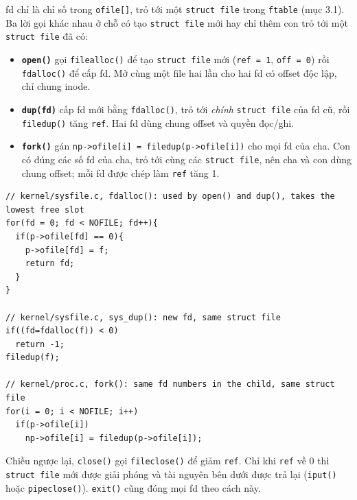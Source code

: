 fd chỉ là chỉ số trong \texttt{ofile[]}, trỏ tới một \texttt{struct file} trong \texttt{ftable} (mục 3.1). Ba lời gọi khác nhau ở chỗ có tạo \texttt{struct file} mới hay chỉ thêm con trỏ tới một \texttt{struct file} đã có:
\begin{itemize}
    \item \textbf{\texttt{open()}} gọi \texttt{filealloc()} để tạo \texttt{struct file} mới (\texttt{ref = 1}, \texttt{off = 0}) rồi \texttt{fdalloc()} để cấp fd. Mở cùng một file hai lần cho hai fd có offset độc lập, chỉ chung inode.
    \item \textbf{\texttt{dup(fd)}} cấp fd mới bằng \texttt{fdalloc()}, trỏ tới \emph{chính} \texttt{struct file} của fd cũ, rồi \texttt{filedup()} tăng \texttt{ref}. Hai fd dùng chung offset và quyền đọc/ghi.
    \item \textbf{\texttt{fork()}} gán \texttt{np->ofile[i] = filedup(p->ofile[i])} cho mọi fd của cha. Con có đúng các số fd của cha, trỏ tới cùng các \texttt{struct file}, nên cha và con dùng chung offset; mỗi fd được chép làm \texttt{ref} tăng 1.
\end{itemize}

\begin{lstlisting}[style=xv6code]
// kernel/sysfile.c, fdalloc(): used by open() and dup(), takes the lowest free slot
for(fd = 0; fd < NOFILE; fd++){
  if(p->ofile[fd] == 0){
    p->ofile[fd] = f;
    return fd;
  }
}

// kernel/sysfile.c, sys_dup(): new fd, same struct file
if((fd=fdalloc(f)) < 0)
  return -1;
filedup(f);

// kernel/proc.c, fork(): same fd numbers in the child, same struct file
for(i = 0; i < NOFILE; i++)
  if(p->ofile[i])
    np->ofile[i] = filedup(p->ofile[i]);
\end{lstlisting}

Chiều ngược lại, \texttt{close()} gọi \texttt{fileclose()} để giảm \texttt{ref}. Chỉ khi \texttt{ref} về 0 thì \texttt{struct file} mới được giải phóng và tài nguyên bên dưới được trả lại (\texttt{iput()} hoặc \texttt{pipeclose()}). \texttt{exit()} cũng đóng mọi fd theo cách này.

